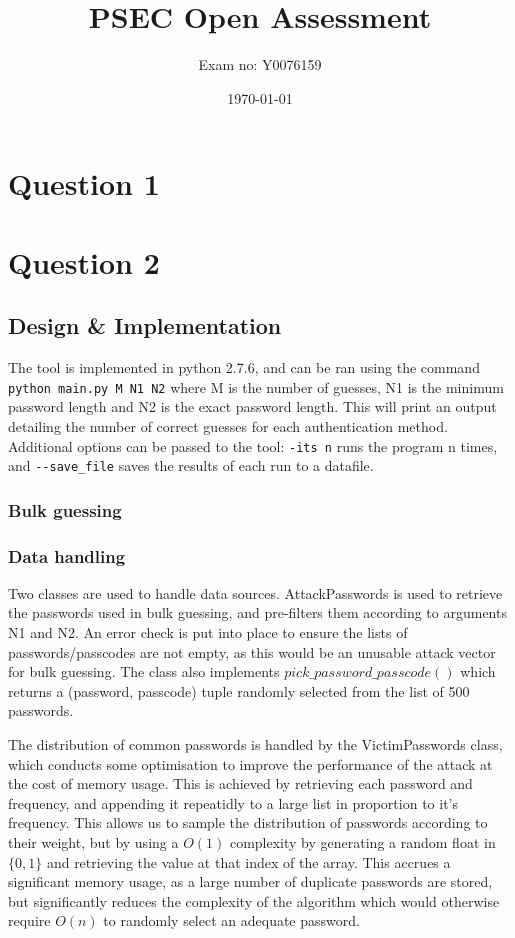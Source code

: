 \documentclass[british,10pt,a4paper]{article}
\begin{document}
\title{PSEC Open Assessment}
\author{Exam no: Y0076159}
\date{\today}
\maketitle
\tableofcontents
\clearpage

\section{Question 1}
\subsection{}
\clearpage


\section{Question 2}
\subsection{Design \& Implementation}
The tool is implemented in python 2.7.6, and can be ran using the command \lstinline{python main.py M N1 N2} where M is the number of guesses, N1 is the minimum password length and N2 is the exact password length. This will print an output detailing the number of correct guesses for each authentication method. Additional options can be passed to the tool: \lstinline{-its n} runs the program n times, and \lstinline{--save_file} saves the results of each run to a datafile.

\subsubsection{Bulk guessing}


\subsubsection{Data handling}
Two classes are used to handle data sources. AttackPasswords is used to retrieve the passwords used in bulk guessing, and pre-filters them according to arguments N1 and N2. An error check is put into place to ensure the lists of passwords/passcodes are not empty, as this would be an unusable attack vector for bulk guessing. The class also implements $pick\_password\_passcode()$ which returns a (password, passcode) tuple randomly selected from the list of 500 passwords.

The distribution of common passwords is handled by the VictimPasswords class, which conducts some optimisation to improve the performance of the attack at the cost of memory usage. This is achieved by retrieving each password and frequency, and appending it repeatidly to a large list in proportion to it's frequency. This allows us to sample the distribution of passwords according to their weight, but by using a $O(1)$ complexity by generating a random float in $\{0,1\}$ and retrieving the value at that index of the array. This accrues a significant memory usage, as a large number of duplicate passwords are stored, but significantly reduces the complexity of the algorithm which would otherwise require $O(n)$ to randomly select an adequate password.
\end{document}
